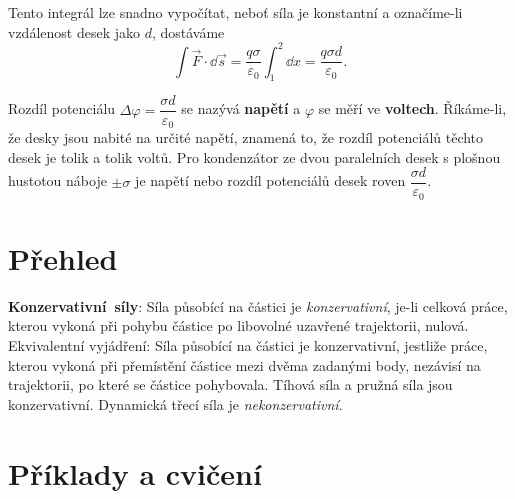     Tento integrál lze snadno vypočítat, neboť síla je konstantní a označíme-li vzdálenost desek 
    jako \(d\), dostáváme
    \begin{equation}\label{fyz:eq014}
      \int\vec{F}\cdot\dd{\vec{s}} = \frac{q\sigma}{\varepsilon_0}\int_1^2\dd{x} 
                                   = \frac{q\sigma d}{\varepsilon_0}.
    \end{equation}
    
    Rozdíl potenciálu \(\Delta\varphi = \dfrac{\sigma d}{\varepsilon_0}\) se nazývá \textbf{napětí} 
    a \(\varphi\) se měří ve \textbf{voltech}. Říkáme-li, že desky jsou nabité na určité napětí, 
    znamená to, že rozdíl potenciálů těchto desek je tolik a tolik voltů. Pro kondenzátor ze dvou 
    paralelních desek s plošnou hustotou náboje \(\pm\sigma\) je napětí nebo rozdíl potenciálů 
    desek roven \(\dfrac{\sigma d}{\varepsilon_0}\).
    
  \section{Přehled}
    \mbox{\textbf{Konzervativní síly}}: Síla působící na částici je \emph{konzervativní}, je-li 
    celková práce, kterou vykoná při pohybu částice po libovolné uzavřené trajektorii, nulová. 
    Ekvivalentní vyjádření: Síla působící na částici je konzervativní, jestliže práce, kterou 
    vykoná při přemístění částice mezi dvěma zadanými body, nezávisí na trajektorii, po které se
    částice pohybovala. Tíhová síla a pružná síla jsou konzervativní. Dynamická třecí síla je 
    \emph{nekonzervativní}.
    
  \section{Příklady a cvičení}  
    
